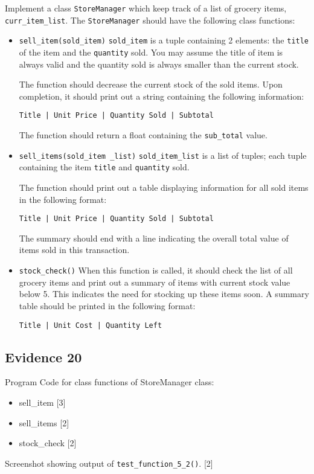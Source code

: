 Implement a class \texttt{StoreManager} which keep track of a list
of grocery items, \texttt{curr\_item\_list}. The \texttt{StoreManager}
should have the following class functions: 
\begin{itemize}
\item \texttt{sell\_item(sold\_item)} \texttt{sold\_item} is a tuple containing
2 elements: the \texttt{title} of the item and the \texttt{quantity}
sold. You may assume the title of item is always valid and the quantity
sold is always smaller than the current stock. 

The function should decrease the current stock of the sold items.
Upon completion, it should print out a string containing the following
information:

\texttt{Title | Unit Price | Quantity Sold | Subtotal}

The function should return a float containing the \texttt{sub\_total}
value.
\item \texttt{sell\_items(sold\_item \_list)} \texttt{sold\_item\_list}
is a list of tuples; each tuple containing the item \texttt{title}
and \texttt{quantity} sold. 

The function should print out a table displaying information for all
sold items in the following format: 

\texttt{Title | Unit Price | Quantity Sold | Subtotal}

The summary should end with a line indicating the overall total value
of items sold in this transaction. 
\item \texttt{stock\_check()} When this function is called, it should check
the list of all grocery items and print out a summary of items with
current stock value below 5. This indicates the need for stocking
up these items soon. A summary table should be printed in the following
format: 

\texttt{Title | Unit Cost | Quantity Left }
\end{itemize}

\subsection*{Evidence 20 }

Program Code for class functions of StoreManager class: 
\begin{itemize}
\item sell\_item \hfill{}{[}3{]}
\item sell\_items \hfill{}{[}2{]}
\item stock\_check \hfill{}{[}2{]}
\end{itemize}
Screenshot showing output of \texttt{test\_function\_5\_2()}.\hfill{}
{[}2{]}